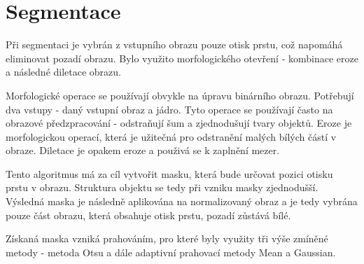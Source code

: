 \section{Segmentace}
Při segmentaci je vybrán z vstupního obrazu pouze otisk prstu, což napomáhá eliminovat pozadí obrazu. Bylo využito morfologického otevření - kombinace eroze a následné diletace obrazu.

Morfologické operace se používají obvykle na úpravu binárního obrazu. Potřebují dva vstupy - daný vstupní obraz a jádro. \cite{OpenCVMorphology} Tyto operace se používají často na obrazové předzpracování - odstraňují šum a zjednodušují tvary objektů. Eroze je morfologickou operací, která je užitečná pro odstranění malých bílých částí v obraze. Diletace je opakem eroze a použivá se k zaplnění mezer. \cite{ExerciseMorphology}

Tento algoritmus má za cíl vytvořit masku, která bude určovat pozici otisku prstu v obrazu. Struktura objektu se tedy při vzniku masky zjednodušší. Výsledná maska je následně aplikována na normalizovaný obraz a je tedy vybrána pouze část obrazu, která obsahuje otisk prstu, pozadí zůstává bílé.

Získaná maska vzniká prahováním, pro které byly využity tři výše zmíněné metody - metoda Otsu a dále adaptivní prahovací metody Mean a Gaussian.

